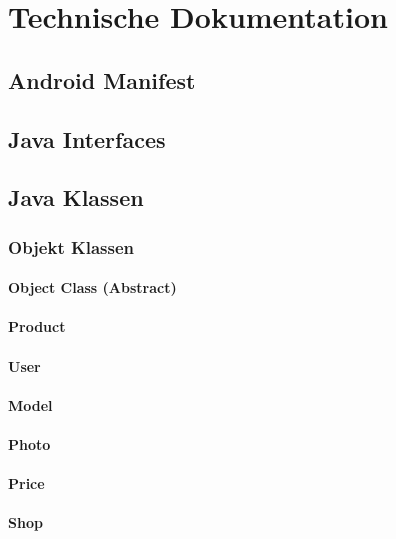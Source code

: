 \documentclass{scrartcl}
\begin{document}
\newpage

\section{Technische Dokumentation}

\subsection{Android Manifest}

\subsection{Java Interfaces}

\subsection{Java Klassen}

\subsubsection{Objekt Klassen}

\paragraph{Object Class (Abstract)}

\paragraph{Product}

\paragraph{User}

\paragraph{Model}

\paragraph{Photo}

\paragraph{Price}

\paragraph{Shop}
\end{document}
